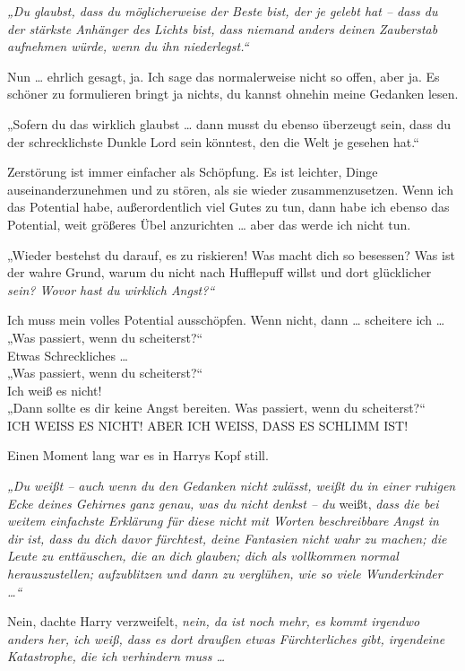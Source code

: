 {\emph{„Du glaubst, dass du möglicherweise der Beste bist, der je gelebt hat -- dass du der stärkste Anhänger des Lichts bist, dass niemand anders deinen Zauberstab aufnehmen würde, wenn du ihn niederlegst.“}

Nun … ehrlich gesagt, ja. Ich sage das normalerweise nicht so offen, aber ja. Es schöner zu formulieren bringt ja nichts, du kannst ohnehin meine Gedanken lesen.

„Sofern du das wirklich glaubst … dann musst du ebenso überzeugt sein, dass du der schrecklichste Dunkle Lord sein könntest, den die Welt je gesehen hat.“

Zerstörung ist immer einfacher als Schöpfung. Es ist leichter, Dinge auseinanderzunehmen und zu stören, als sie wieder zusammenzusetzen. Wenn ich das Potential habe, außerordentlich viel Gutes zu tun, dann habe ich ebenso das Potential, weit größeres Übel anzurichten … aber das werde ich nicht tun.

„Wieder bestehst du darauf, es zu riskieren! Was macht dich so besessen? Was ist der wahre Grund, warum du nicht nach Hufflepuff willst und dort glücklicher \emph{sein? Wovor hast du wirklich Angst?“}

Ich muss mein volles Potential ausschöpfen. Wenn nicht, dann … scheitere ich …\\ „Was passiert, wenn du scheiterst?“\\ Etwas Schreckliches …\\ „Was passiert, wenn du scheiterst?“\\ Ich weiß es nicht!\\ „Dann sollte es dir keine Angst bereiten. Was passiert, wenn du scheiterst?“\\ ICH WEISS ES NICHT! ABER ICH WEISS, DASS ES SCHLIMM IST!

Einen Moment lang war es in Harrys Kopf still.

\emph{„Du weißt -- auch wenn du den Gedanken nicht zulässt, weißt du in einer ruhigen Ecke deines Gehirnes ganz genau, was du nicht denkst -- du} weißt, \emph{dass die bei weitem einfachste Erklärung für diese nicht mit Worten beschreibbare Angst in dir ist, dass du dich davor fürchtest, deine Fantasien nicht wahr zu machen; die Leute zu enttäuschen, die an dich glauben; dich als vollkommen normal herauszustellen; aufzublitzen und dann zu verglühen, wie so viele Wunderkinder …“}

Nein, dachte Harry verzweifelt, \emph{nein, da ist noch mehr, es kommt irgendwo anders her, ich weiß, dass es dort draußen etwas Fürchterliches gibt, irgendeine Katastrophe, die ich verhindern muss …}

}
